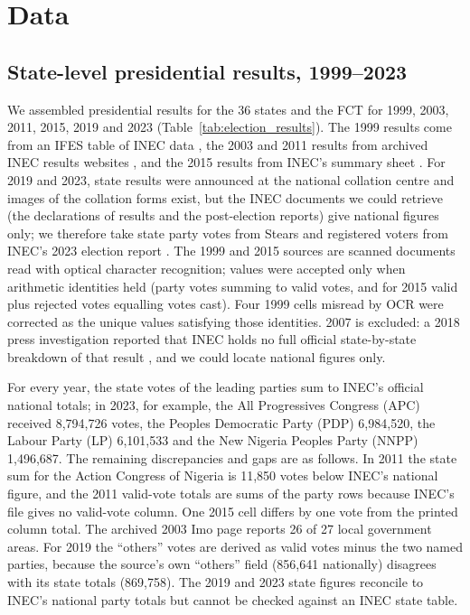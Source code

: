 \documentclass[preprint,12pt,authoryear]{elsarticle}
\begin{document}
\section{Data}
\label{sec:data}

\subsection{State-level presidential results, 1999--2023}
We assembled presidential results for the 36 states and the FCT for 1999, 2003, 2011, 2015, 2019 and 2023 (Table~\ref{tab:election_results}). The 1999 results come from an IFES table of INEC data \citep{IFES1999}, the 2003 and 2011 results from archived INEC results websites \citep{INEC2003, INEC2011}, and the 2015 results from INEC's summary sheet \citep{INEC2015}. For 2019 and 2023, state results were announced at the national collation centre and images of the collation forms exist, but the INEC documents we could retrieve (the declarations of results and the post-election reports) give national figures only; we therefore take state party votes from Stears \citep{Stears2023} and registered voters from INEC's 2023 election report \citep{INEC2024Report}. The 1999 and 2015 sources are scanned documents read with optical character recognition; values were accepted only when arithmetic identities held (party votes summing to valid votes, and for 2015 valid plus rejected votes equalling votes cast). Four 1999 cells misread by OCR were corrected as the unique values satisfying those identities. 2007 is excluded: a 2018 press investigation reported that INEC holds no full official state-by-state breakdown of that result \citep{TheCable2018}, and we could locate national figures only.

For every year, the state votes of the leading parties sum to INEC's official national totals; in 2023, for example, the All Progressives Congress (APC) received 8,794,726 votes, the Peoples Democratic Party (PDP) 6,984,520, the Labour Party (LP) 6,101,533 and the New Nigeria Peoples Party (NNPP) 1,496,687. The remaining discrepancies and gaps are as follows. In 2011 the state sum for the Action Congress of Nigeria is 11,850 votes below INEC's national figure, and the 2011 valid-vote totals are sums of the party rows because INEC's file gives no valid-vote column. One 2015 cell differs by one vote from the printed column total. The archived 2003 Imo page reports 26 of 27 local government areas. For 2019 the ``others'' votes are derived as valid votes minus the two named parties, because the source's own ``others'' field (856,641 nationally) disagrees with its state totals (869,758). The 2019 and 2023 state figures reconcile to INEC's national party totals but cannot be checked against an INEC state table.
\end{document}
